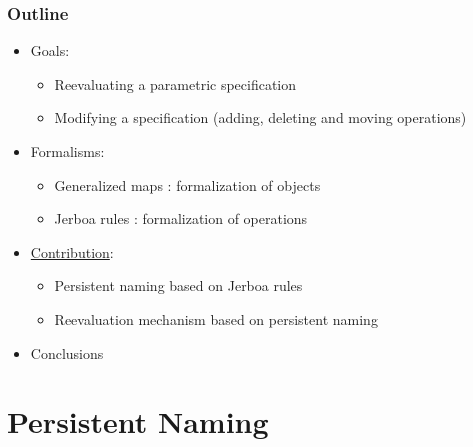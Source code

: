 \documentclass[]{beamer}
\begin{document}
\begin{frame}
	\frametitle{Outline}
	\begin{itemize}
		\item Goals:
		      \begin{itemize}
			      \item Reevaluating a parametric specification
			      \item Modifying a specification (adding, deleting and moving
			            operations)
		      \end{itemize}

		      \vspace{1em}

		\item Formalisms:
		      \begin{itemize}
			      \item Generalized maps : formalization of objects
			      \item Jerboa rules : formalization of operations
		      \end{itemize}

		      \vspace{1em}

		\item \underline{Contribution}:
		      \begin{itemize}
			      \item Persistent naming based on Jerboa rules
			      \item Reevaluation mechanism based on persistent naming
		      \end{itemize}
	  \item Conclusions
	\end{itemize}
\end{frame}

\section{Persistent Naming}

\end{document}
